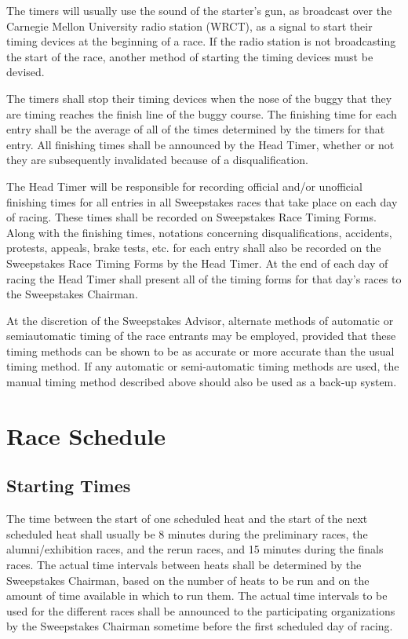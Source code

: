 	The timers will usually use the sound of the starter's gun, as broadcast over
	the Carnegie Mellon University radio station (WRCT), as a signal to start their
	timing devices at the beginning of a race. If the radio station is not
	broadcasting the start of the race, another method of starting the timing
	devices must be devised.

	The timers shall stop their timing devices when the nose of the buggy that they
	are timing reaches the finish line of the buggy course. The finishing time for
	each entry shall be the average of all of the times determined by the timers
	for that entry. All finishing times shall be announced by the Head Timer,
	whether or not they are subsequently invalidated because of a disqualification.

	The Head Timer will be responsible for recording official and/or unofficial
	finishing times for all entries in all Sweepstakes races that take place on
	each day of racing. These times shall be recorded on Sweepstakes Race Timing
	Forms. Along with the finishing times, notations concerning disqualifications,
	accidents, protests, appeals, brake tests, etc. for each entry shall also be
	recorded on the Sweepstakes Race Timing Forms by the Head Timer. At the end of
	each day of racing the Head Timer shall present all of the timing forms for
	that day's races to the Sweepstakes Chairman.

	At the discretion of the Sweepstakes Advisor, alternate methods of automatic or
	semiautomatic timing of the race entrants may be employed, provided that these
	timing methods can be shown to be as accurate or more accurate than the usual
	timing method. If any automatic or semi-automatic timing methods are used, the
	manual timing method described above should also be used as a back-up system.
	
\section{Race Schedule}

\subsection{Starting Times}

	The time between the start of one scheduled heat and the start of the next
	scheduled heat shall usually be 8 minutes during the preliminary races, the
	alumni/exhibition races, and the rerun races, and 15 minutes during the finals
	races. The actual time intervals between heats shall be determined by the
	Sweepstakes Chairman, based on the number of heats to be run and on the amount
	of time available in which to run them. The actual time intervals to be used
	for the different races shall be announced to the participating organizations
	by the Sweepstakes Chairman sometime before the first scheduled day of racing.

